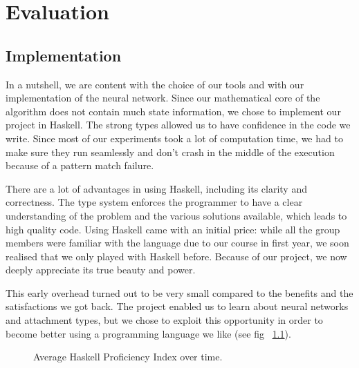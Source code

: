 \chapter{Evaluation}




\section{Implementation}

In a nutshell, we are content with the choice of our tools and with our implementation of the neural network. Since our mathematical core of the algorithm does not contain much state information, we chose to implement our project in Haskell.
The strong types allowed us to have confidence in the code we write. Since most of our experiments took a lot of computation time, we had to make sure they run seamlessly and don't crash in the middle of the execution because of a pattern match failure.

There are a lot of advantages in using Haskell, including its clarity and correctness. The type system enforces the programmer to have a clear understanding of the problem and the various solutions available, which leads to high quality code.
Using Haskell came with an initial price: while all the group members were familiar with the language due to our course in first year, we soon realised that we only played with Haskell before. Because of our project, we now deeply appreciate its true beauty and power.

This early overhead turned out to be very small compared to the benefits and the satisfactions we got back. The project enabled us to learn about neural networks and attachment types, but we chose to exploit this opportunity in order to become better using a programming language we like (see fig ~\ref{fig:Haskell Proficieny Index over time}).
\begin{figure}[h]

\caption{Average Haskell Proficiency Index over time.}
\label{fig:Haskell Proficieny Index over time}
\end{figure}

